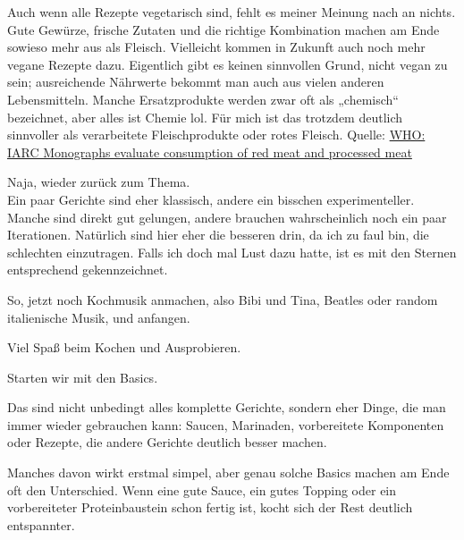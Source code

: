 \documentclass[
  a4paper,
  twoside,
  11pt
]{article}
\begin{document}
Auch wenn alle Rezepte vegetarisch sind, fehlt es meiner Meinung nach an nichts. Gute Gewürze, frische Zutaten und die richtige Kombination machen am Ende sowieso mehr aus als Fleisch. Vielleicht kommen in Zukunft auch noch mehr vegane Rezepte dazu. Eigentlich gibt es keinen sinnvollen Grund, nicht vegan zu sein; ausreichende Nährwerte bekommt man auch aus vielen anderen Lebensmitteln. Manche Ersatzprodukte werden zwar oft als „chemisch“ bezeichnet, aber alles ist Chemie lol. Für mich ist das trotzdem deutlich sinnvoller als verarbeitete Fleischprodukte oder rotes Fleisch. Quelle:
\href{https://www.iarc.who.int/wp-content/uploads/2018/07/pr240_E.pdf}{WHO: IARC Monographs evaluate consumption of red meat and processed meat}

Naja, wieder zurück zum Thema.\\
Ein paar Gerichte sind eher klassisch, andere ein bisschen experimenteller. Manche sind direkt gut gelungen, andere brauchen wahrscheinlich noch ein paar Iterationen. Natürlich sind hier eher die besseren drin, da ich zu faul bin, die schlechten einzutragen. Falls ich doch mal Lust dazu hatte, ist es mit den Sternen entsprechend gekennzeichnet.

So, jetzt noch Kochmusik anmachen, also Bibi und Tina, Beatles oder random italienische Musik, und anfangen.

Viel Spaß beim Kochen und Ausprobieren.

\newpage
%




Starten wir mit den Basics.

Das sind nicht unbedingt alles komplette Gerichte, sondern eher Dinge, die man immer wieder gebrauchen kann: Saucen, Marinaden, vorbereitete Komponenten oder Rezepte, die andere Gerichte deutlich besser machen.

Manches davon wirkt erstmal simpel, aber genau solche Basics machen am Ende oft den Unterschied. Wenn eine gute Sauce, ein gutes Topping oder ein vorbereiteter Proteinbaustein schon fertig ist, kocht sich der Rest deutlich entspannter.

\mylocaltableofcontents%
\newpage








\end{document}
